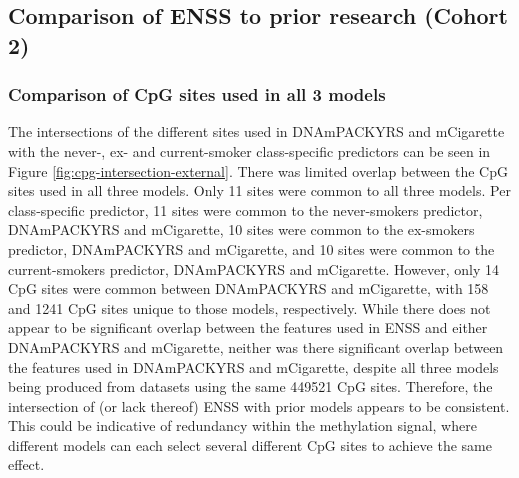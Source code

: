 \documentclass[draft]{article} %
\begin{document}
\newpage
\subsection{Comparison of ENSS to prior research (Cohort 2)} \label{sec:model-comparisons}


\subsubsection{Comparison of CpG sites used in all 3 models} \label{sec:sites-comparison}

The intersections of the different sites used in DNAmPACKYRS and mCigarette with the never-, ex- and current-smoker class-specific predictors can be seen in Figure \ref{fig:cpg-intersection-external}. There was limited overlap between the CpG sites used in all three models. Only 11 sites were common to all three models. Per class-specific predictor, 11 sites were common to the never-smokers predictor, DNAmPACKYRS and mCigarette, 10 sites were common to the ex-smokers predictor, DNAmPACKYRS and mCigarette, and 10 sites were common to the current-smokers predictor, DNAmPACKYRS and mCigarette. However, only 14 CpG sites were common between DNAmPACKYRS and mCigarette, with 158 and 1241 CpG sites unique to those models, respectively. While there does not appear to be significant overlap between the features used in ENSS and either DNAmPACKYRS and mCigarette, neither was there significant overlap between the features used in DNAmPACKYRS and mCigarette, despite all three models being produced from datasets using the same \num{449521} CpG sites. Therefore, the intersection of (or lack thereof) ENSS with prior models appears to be consistent. This could be indicative of redundancy within the methylation signal, where different models can each select several different CpG sites to achieve the same effect.
\end{document}
